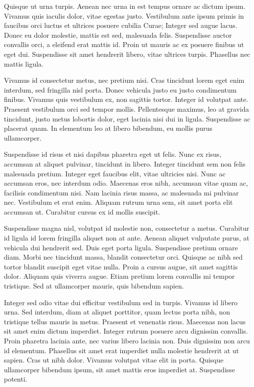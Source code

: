 Quisque ut urna turpis. Aenean nec urna in est tempus ornare ac dictum ipsum. Vivamus quis iaculis dolor, vitae egestas justo. Vestibulum ante ipsum primis in faucibus orci luctus et ultrices posuere cubilia Curae; Integer sed augue lacus. Donec eu dolor molestie, mattis est sed, malesuada felis. Suspendisse auctor convallis orci, a eleifend erat mattis id. Proin ut mauris ac ex posuere finibus ut eget dui. Suspendisse sit amet hendrerit libero, vitae ultrices turpis. Phasellus nec mattis ligula.

Vivamus id consectetur metus, nec pretium nisi. Cras tincidunt lorem eget enim interdum, sed fringilla nisl porta. Donec vehicula justo eu justo condimentum finibus. Vivamus quis vestibulum ex, non sagittis tortor. Integer id volutpat ante. Praesent vestibulum orci sed tempor mollis. Pellentesque maximus, leo at gravida tincidunt, justo metus lobortis dolor, eget lacinia nisi dui in ligula. Suspendisse ac placerat quam. In elementum leo at libero bibendum, eu mollis purus ullamcorper.

Suspendisse id risus et nisi dapibus pharetra eget ut felis. Nunc ex risus, accumsan at aliquet pulvinar, tincidunt in libero. Integer tincidunt sem non felis malesuada pretium. Integer eget faucibus elit, vitae ultricies nisi. Nunc ac accumsan eros, nec interdum odio. Maecenas eros nibh, accumsan vitae quam ac, facilisis condimentum nisi. Nam lacinia risus massa, ac malesuada mi pulvinar nec. Vestibulum et erat enim. Aliquam rutrum urna sem, sit amet porta elit accumsan ut. Curabitur cursus ex id mollis suscipit.

Suspendisse magna nisl, volutpat id molestie non, consectetur a metus. Curabitur id ligula id lorem fringilla aliquet non at ante. Aenean aliquet vulputate purus, at vehicula dui hendrerit sed. Duis eget porta ligula. Suspendisse pretium ornare diam. Morbi nec tincidunt massa, blandit consectetur orci. Quisque ac nibh sed tortor blandit suscipit eget vitae nulla. Proin a cursus augue, sit amet sagittis dolor. Aliquam quis viverra augue. Etiam pretium lorem convallis mi tempor tristique. Sed at ullamcorper mauris, quis bibendum sapien.

Integer sed odio vitae dui efficitur vestibulum sed in turpis. Vivamus id libero urna. Sed interdum, diam at aliquet porttitor, quam lectus porta nibh, non tristique tellus mauris in metus. Praesent et venenatis risus. Maecenas non lacus sit amet enim dictum imperdiet. Integer rutrum posuere arcu dignissim convallis. Proin pharetra lacinia ante, nec varius libero lacinia non. Duis dignissim non arcu id elementum. Phasellus sit amet erat imperdiet nulla molestie hendrerit at ut sapien. Cras ut nibh dolor. Vivamus volutpat vitae elit in porta. Quisque ullamcorper bibendum ipsum, sit amet mattis eros imperdiet at. Suspendisse potenti.

